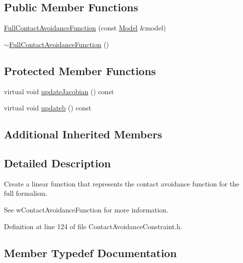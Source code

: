 \subsection*{Public Member Functions}
\begin{DoxyCompactItemize}
\item 
\hyperlink{classocra_1_1FullContactAvoidanceFunction_aa1632bec7158003ab2da17f71aa134e0}{Full\+Contact\+Avoidance\+Function} (const \hyperlink{classocra_1_1Model}{Model} \&model)
\item 
\hyperlink{classocra_1_1FullContactAvoidanceFunction_abf414a050f3b16c4a095049937335c96}{$\sim$\+Full\+Contact\+Avoidance\+Function} ()
\end{DoxyCompactItemize}
\subsection*{Protected Member Functions}
\begin{DoxyCompactItemize}
\item 
virtual void \hyperlink{classocra_1_1FullContactAvoidanceFunction_a91b21004faed7ffa6a51e975abc93797}{update\+Jacobian} () const
\item 
virtual void \hyperlink{classocra_1_1FullContactAvoidanceFunction_ae24690ecd464eefd43936907e33c4cb9}{updateb} () const
\end{DoxyCompactItemize}
\subsection*{Additional Inherited Members}


\subsection{Detailed Description}
Create a linear function that represents the contact avoidance function for the full formalism. 

See w\+Contact\+Avoidance\+Function for more information. 

Definition at line 124 of file Contact\+Avoidance\+Constraint.\+h.



\subsection{Member Typedef Documentation}
\hypertarget{classocra_1_1FullContactAvoidanceFunction_a9b59cb139be82095188084893d70b996}{}\label{classocra_1_1FullContactAvoidanceFunction_a9b59cb139be82095188084893d70b996} 

